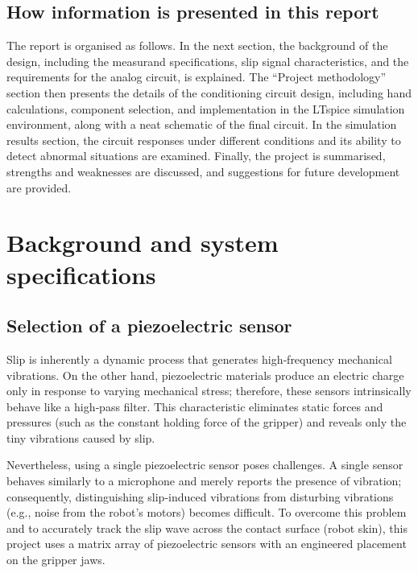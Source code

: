 \documentclass[12pt,a4paper]{article}
\begin{document}
\subsection*{How information is presented in this report}
The report is organised as follows. In the next section, the background of the design, including the measurand specifications, slip signal characteristics, and the requirements for the analog circuit, is explained. The “Project methodology” section then presents the details of the conditioning circuit design, including hand calculations, component selection, and implementation in the LTspice simulation environment, along with a neat schematic of the final circuit. In the simulation results section, the circuit responses under different conditions and its ability to detect abnormal situations are examined. Finally, the project is summarised, strengths and weaknesses are discussed, and suggestions for future development are provided.

\section{Background and system specifications}
\label{sec:background}

\subsection{Selection of a piezoelectric sensor}
Slip is inherently a dynamic process that generates high‑frequency mechanical vibrations. On the other hand, piezoelectric materials produce an electric charge only in response to varying mechanical stress; therefore, these sensors intrinsically behave like a high‑pass filter. This characteristic eliminates static forces and pressures (such as the constant holding force of the gripper) and reveals only the tiny vibrations caused by slip.

Nevertheless, using a single piezoelectric sensor poses challenges. A single sensor behaves similarly to a microphone and merely reports the presence of vibration; consequently, distinguishing slip‑induced vibrations from disturbing vibrations (e.g., noise from the robot's motors) becomes difficult. To overcome this problem and to accurately track the slip wave across the contact surface (robot skin), this project uses a matrix array of piezoelectric sensors with an engineered placement on the gripper jaws.
\end{document}
